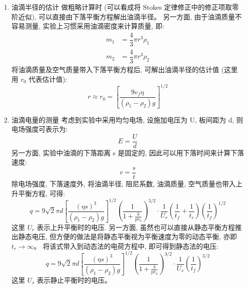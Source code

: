 \documentclass[dvipsnames, svgnames,a4paper,11pt]{article}
\begin{document}
\begin{enumerate}
			若向上的电场继续增加，油滴将会以匀速上升的方式达到平衡。设平衡速度为 $v_\mathrm {r}$，对应电压为 $E_\mathrm {r}$，则平衡方程为:
			\begin{equation*}
				q E_\mathrm {r} + m_2 g - m_1 g - K6 \pi r v_\mathrm {r} \eta = 0
			\end{equation*}
			
			实际上，本实验中的核心方程就是下落平衡方程，静止平衡方程以及上升平衡方程。可知，其中主要的未知量只是油滴电量 $q$ 以及油滴半径 $r$。由于这里有三个方程，因此只需取两个就可以解出所有未知。后面的推导中将看到，通过下落平衡方程的近似方程可以得到油滴半径的粗估值，之后分别带入静止平衡方程以及上升平衡方程即可得到油滴电量，前者称为静态法，后者称为动态法。
			
			\item 油滴半径的估计
			做粗略计算时 (可以看成将 Stokes 定律修正中的修正项取零阶近似), 可以直接由下落平衡方程解出油滴半径。 另一方面, 由于油滴质量不容易测量, 实验上习惯采用油滴密度来计算质量, 即:
			\begin{align*}
				m_1 &= \dfrac{4}{3}\pi r^3\rho_1 \\
				m_2 &= \dfrac{4}{3}\pi r^3\rho_2
			\end{align*}
			将油滴质量及空气质量带入下落平衡方程后, 可解出油滴半径的估计值 (这里用 $r_0$ 代表估计值):
			$$r\approx r_0=\left[\dfrac{9v_f\eta}{(\rho_1-\rho_2)g}\right]^{1/2}$$
			
			\item 油滴电量的测量
			考虑到实验中采用均匀电场, 设施加电压为 U, 板间距为 d, 则电场强度可表示为:
			$$E=\dfrac{U}{d}$$
			另一方面, 实验中油滴的下落距离 s 是固定的, 因此可以用下落时间来计算下落速度:
			$$v=\dfrac{s}{t}$$
			除电场强度, 下落速度外, 将油滴半径, 阻尼系数, 油滴质量, 空气质量也带入上升平衡方程, 可得:
			$$q=9\sqrt{2}\pi d\left[\dfrac{(\eta s)^3}{(\rho_1-\rho_2)g}\right]^{1/2}\left(\dfrac{1}{1+\frac{b}{pr_0}}\right)^{3/2}\cdot\dfrac{1}{U_r}\left(\dfrac{1}{t_f}+\dfrac{1}{t_r}\right)\left(\dfrac{1}{t_f}\right)^{1/2}$$
			这里 $U_r$ 表示上升平衡时的电压. 另一方面, 虽然也可以直接从静态平衡方程推出静态电压, 但方便的做法是将静态平衡视为平衡速度为零的动态平衡, 亦即 $t_r \to \infty$。 将该式带入到动态法的电荷方程中, 即可得到静态法的电压:
			$$q=9\sqrt{2}\pi d\left[\dfrac{(\eta s)^3}{(\rho_1-\rho_2)g}\right]^{1/2}\left(\dfrac{1}{1+\frac{b}{pr_0}}\right)^{3/2}\cdot\dfrac{1}{U_s}\left(\dfrac{1}{t_f}\right)^{3/2}$$
			这里 $U_s$ 表示静止平衡时的电压。		
	\end{enumerate}
	
\end{document}
